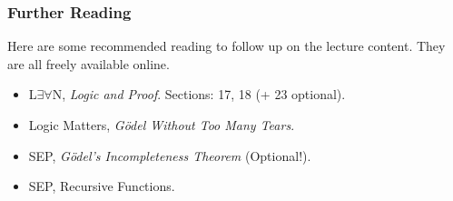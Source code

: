 \documentclass{beamer}
\begin{document}
\begin{frame}
	\frametitle{Further Reading}
	
	Here are some recommended reading to follow up on the lecture content. They are all freely available online. 
	
	\vspace{0.5cm}
	
	\begin{itemize}
		\item L$\exists \forall$N, \emph{Logic and Proof}. Sections: 17, 18 (+ 23 optional).
		\item Logic Matters, \emph{G\"{o}del Without Too Many Tears}.
		\item SEP, \emph{G\"{o}del's Incompleteness Theorem} (Optional!).
		\item SEP, Recursive Functions.
	\end{itemize}
	
\end{frame}
\end{document}
